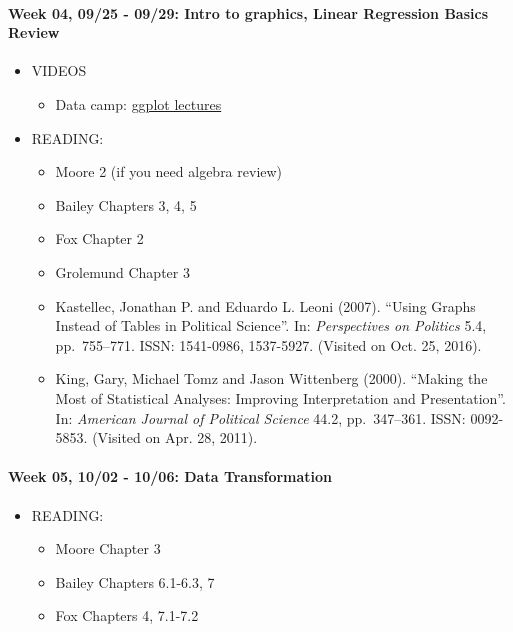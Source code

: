 \documentclass[11pt,]{article}
\providecommand{\tightlist}{%
  \setlength{\itemsep}{0pt}\setlength{\parskip}{0pt}}
\begin{document}
\paragraph{Week 04, 09/25 - 09/29: Intro to graphics, Linear Regression
Basics
Review}\label{week-04-0925---0929-intro-to-graphics-linear-regression-basics-review}

\begin{itemize}
\tightlist
\item
  VIDEOS

  \begin{itemize}
  \tightlist
  \item
    Data camp:
    \href{https://www.datacamp.com/courses/data-visualization-with-ggplot2-1}{ggplot
    lectures}
  \end{itemize}
\item
  READING:

  \begin{itemize}
  \item
    Moore 2 (if you need algebra review)
  \item
    Bailey Chapters 3, 4, 5
  \item
    Fox Chapter 2
  \item
    Grolemund Chapter 3
  \item
     Kastellec, Jonathan P. and Eduardo L. Leoni
    (2007). ``Using Graphs Instead of Tables in Political Science''. In:
    \emph{Perspectives on Politics} 5.4, pp.~755--771. ISSN: 1541-0986,
    1537-5927. (Visited on Oct. 25, 2016).
  \item
     King, Gary, Michael Tomz and Jason Wittenberg
    (2000). ``Making the Most of Statistical Analyses: Improving
    Interpretation and Presentation''. In:
    \emph{American Journal of Political Science} 44.2, pp.~347--361.
    ISSN: 0092-5853. (Visited on Apr. 28, 2011).
  \end{itemize}
\end{itemize}

\paragraph{Week 05, 10/02 - 10/06: Data
Transformation}\label{week-05-1002---1006-data-transformation}

\begin{itemize}
\tightlist
\item
  READING:

  \begin{itemize}
  \tightlist
  \item
    Moore Chapter 3
  \item
    Bailey Chapters 6.1-6.3, 7
  \item
    Fox Chapters 4, 7.1-7.2
  \end{itemize}
\end{itemize}
\end{document}
